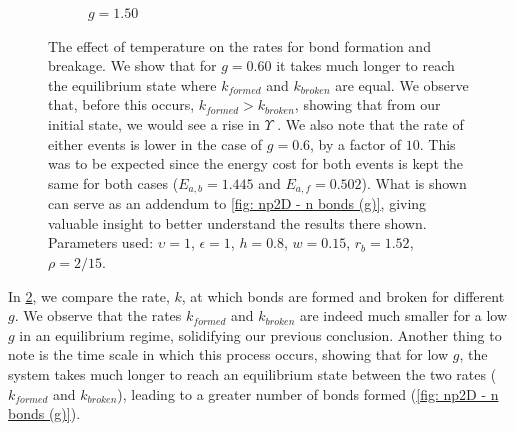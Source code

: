 \documentclass[../../main.tex]{subfiles}
\begin{document}
\begin{figure}[h]
\begin{subfigure}[b]{0.45\textwidth}
                \caption{$g = 1.50$}
                \label{fig: np2D - rate (g=1.50)}
            \end{subfigure}
            \caption{The effect of temperature on the rates for bond formation and breakage. We show that for $g = 0.60$ it takes much longer to reach the equilibrium state where $k_{formed}$ and $k_{broken}$ are equal. We observe that, before this occurs, $k_{formed} > k_{broken}$, showing that from our initial state, we would see a rise in $\Upsilon$ . We also note that the rate of either events is lower in the case of $g=0.6$, by a factor of $10$. This was to be expected since the energy cost for both events is kept the same for both cases ($E_{a, b} = 1.445$ and $E_{a, f} = 0.502$). What is shown can serve as an addendum to \cref{fig: np2D - n bonds (g)}, giving valuable insight to better understand the results there shown. Parameters used: $\upsilon = 1$, $\epsilon = 1$, $h = 0.8$, $w = 0.15$, $r_b = 1.52$, $\rho = 2/15$.}
            \label{fig: np2D - rate}
        \end{figure}     

    In \cref{fig: np2D - rate}, we compare the rate, $k$, at which bonds are formed and broken for different $g$. We observe that the rates $k_{formed}$ and $k_{broken}$ are indeed much smaller for a low $g$ in an equilibrium regime, solidifying our previous conclusion. Another thing to note is the time scale in which this process occurs, showing that for low $g$, the system takes much longer to reach an equilibrium state between the two rates ($k_{formed}$ and $k_{broken}$), leading to a greater number of bonds formed (\cref{fig: np2D - n bonds (g)}). 
    
\end{document}
